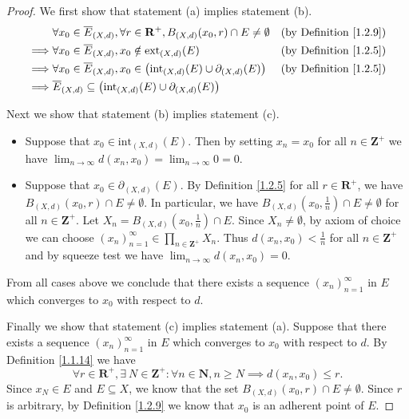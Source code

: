 \begin{proof}
    We first show that statement (a) implies statement (b).
    \begin{align*}
                 & \forall x_0 \in \overline{E}_{(X, d)}, \forall r \in \mathbf{R}^+, B_{(X, d)}(x_0, r) \cap E \neq \emptyset & \text{(by Definition \ref{1.2.9})} \\
        \implies & \forall x_0 \in \overline{E}_{(X, d)}, x_0 \notin \text{ext}_{(X, d)}(E)                                    & \text{(by Definition \ref{1.2.5})} \\
        \implies & \forall x_0 \in \overline{E}_{(X, d)}, x_0 \in \big(\text{int}_{(X, d)}(E) \cup \partial_{(X, d)}(E)\big)   & \text{(by Definition \ref{1.2.5})} \\
        \implies & \overline{E}_{(X, d)} \subseteq \big(\text{int}_{(X, d)}(E) \cup \partial_{(X, d)}(E)\big)
    \end{align*}

    Next we show that statement (b) implies statement (c).
    \begin{itemize}
        \item Suppose that \(x_0 \in \text{int}_{(X, d)}(E)\).
              Then by setting \(x_n = x_0\) for all \(n \in \mathbf{Z}^+\) we have \(\lim_{n \to \infty} d(x_n, x_0) = \lim_{n \to \infty} 0 = 0\).
        \item Suppose that \(x_0 \in \partial_{(X, d)}(E)\).
              By Definition \ref{1.2.5} for all \(r \in \mathbf{R}^+\), we have \(B_{(X, d)}(x_0, r) \cap E \neq \emptyset\).
              In particular, we have \(B_{(X, d)}(x_0, \frac{1}{n}) \cap E \neq \emptyset\) for all \(n \in \mathbf{Z}^+\).
              Let \(X_n = B_{(X, d)}(x_0, \frac{1}{n}) \cap E\).
              Since \(X_n \neq \emptyset\), by axiom of choice we can choose \((x_n)_{n = 1}^\infty \in \prod_{n \in \mathbf{Z}^+} X_n\).
              Thus \(d(x_n, x_0) < \frac{1}{n}\) for all \(n \in \mathbf{Z}^+\) and by squeeze test we have \(\lim_{n \to \infty} d(x_n, x_0) = 0\).
    \end{itemize}
    From all cases above we conclude that there exists a sequence \((x_n)_{n = 1}^\infty\) in \(E\) which converges to \(x_0\) with respect to \(d\).

    Finally we show that statement (c) implies statement (a).
    Suppose that there exists a sequence \((x_n)_{n = 1}^\infty\) in \(E\) which converges to \(x_0\) with respect to \(d\).
    By Definition \ref{1.1.14} we have
    \[
        \forall r \in \mathbf{R}^+, \exists\ N \in \mathbf{Z}^+ : \forall n \in \mathbf{N}, n \geq N \implies d(x_n, x_0) \leq r.
    \]
    Since \(x_N \in E\) and \(E \subseteq X\), we know that the set \(B_{(X, d)}(x_0, r) \cap E \neq \emptyset\).
    Since \(r\) is arbitrary, by Definition \ref{1.2.9} we know that \(x_0\) is an adherent point of \(E\).
\end{proof}

